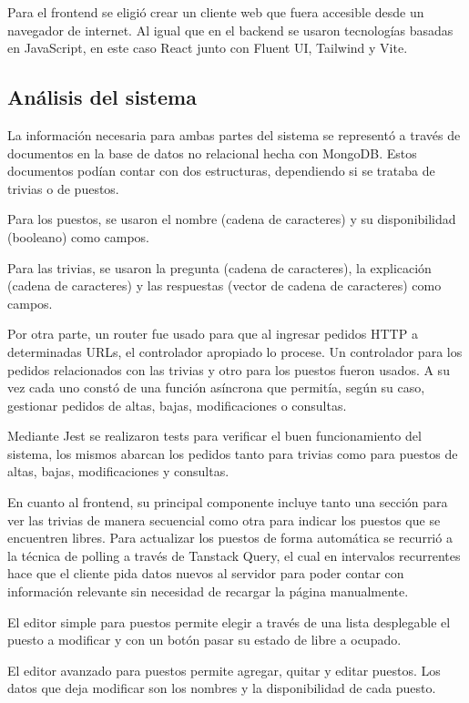 \documentclass[twoside]{article}
\begin{document}
Para el frontend se eligió crear un cliente web que fuera accesible desde un navegador de internet. Al igual que en el backend se usaron tecnologías basadas en JavaScript, en este caso React junto con Fluent UI, Tailwind y Vite.
\newpage
\subsection{Análisis del sistema}
La información necesaria para ambas partes del sistema se representó a través de documentos en la base de datos no relacional hecha con MongoDB. Estos documentos podían contar con dos estructuras, dependiendo si se trataba de trivias o de puestos.

Para los puestos, se usaron el nombre (cadena de caracteres) y su disponibilidad (booleano) como campos.

Para las trivias, se usaron la pregunta (cadena de caracteres), la explicación (cadena de caracteres) y las respuestas (vector de cadena de caracteres) como campos.

Por otra parte, un router fue usado para que al ingresar pedidos HTTP a determinadas URLs, el controlador apropiado lo procese. Un controlador para los pedidos relacionados con las trivias y otro para los puestos fueron usados. A su vez cada uno constó de una función asíncrona que permitía, según su caso, gestionar pedidos de altas, bajas, modificaciones o consultas.

Mediante Jest se realizaron tests para verificar el buen funcionamiento del sistema, los mismos abarcan los pedidos tanto para trivias como para puestos de altas, bajas, modificaciones y consultas.

En cuanto al frontend, su principal componente incluye tanto una sección para ver las trivias de manera secuencial como otra para indicar los puestos que se encuentren libres. Para actualizar los puestos de forma automática se recurrió a la técnica de polling a través de Tanstack Query, el cual en intervalos recurrentes hace que el cliente pida datos nuevos al servidor para poder contar con información relevante sin necesidad de recargar la página manualmente.

El editor simple para puestos permite elegir a través de una lista desplegable el puesto a modificar y con un botón pasar su estado de libre a ocupado.

El editor avanzado para puestos permite agregar, quitar y editar puestos. Los datos que deja modificar son los nombres y la disponibilidad de cada puesto.
\end{document}
